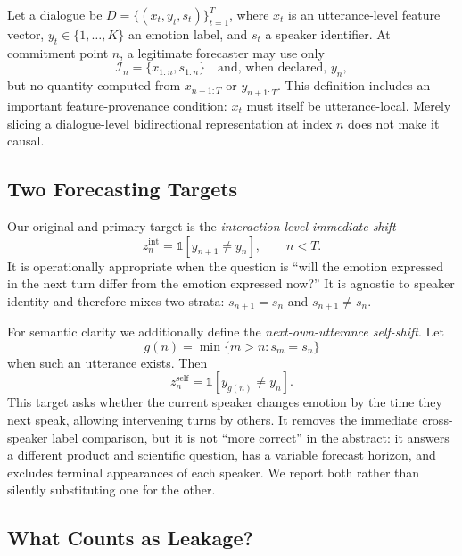 \documentclass{ieeeaccess}
\begin{document}
Let a dialogue be $D=\{(x_t,y_t,s_t)\}_{t=1}^{T}$, where $x_t$ is an utterance-level feature
vector, $y_t\in\{1,\ldots,K\}$ an emotion label, and $s_t$ a speaker identifier. At commitment
point $n$, a legitimate forecaster may use only
\begin{equation}
\mathcal{I}_n=\{x_{1:n},s_{1:n}\}\quad\text{and, when declared, }y_n,
\label{eq:info}
\end{equation}
but no quantity computed from $x_{n+1:T}$ or $y_{n+1:T}$. This definition includes an important
feature-provenance condition: $x_t$ must itself be utterance-local. Merely slicing a dialogue-level
bidirectional representation at index $n$ does not make it causal.

\subsection{Two Forecasting Targets}

Our original and primary target is the \emph{interaction-level immediate shift}
\begin{equation}
z_n^{\mathrm{int}}=\mathbb{1}[y_{n+1}\neq y_n],\qquad n<T.
\label{eq:interaction}
\end{equation}
It is operationally appropriate when the question is ``will the emotion expressed in the next
turn differ from the emotion expressed now?'' It is agnostic to speaker identity and therefore
mixes two strata: $s_{n+1}=s_n$ and $s_{n+1}\neq s_n$.

For semantic clarity we additionally define the \emph{next-own-utterance self-shift}. Let
\begin{equation}
g(n)=\min\{m>n:s_m=s_n\}
\end{equation}
when such an utterance exists. Then
\begin{equation}
z_n^{\mathrm{self}}=\mathbb{1}[y_{g(n)}\neq y_n].
\label{eq:self}
\end{equation}
This target asks whether the current speaker changes emotion by the time they next speak, allowing
intervening turns by others. It removes the immediate cross-speaker label comparison, but it is not
``more correct'' in the abstract: it answers a different product and scientific question, has a
variable forecast horizon, and excludes terminal appearances of each speaker. We report both rather
than silently substituting one for the other.

\subsection{What Counts as Leakage?}
\end{document}
